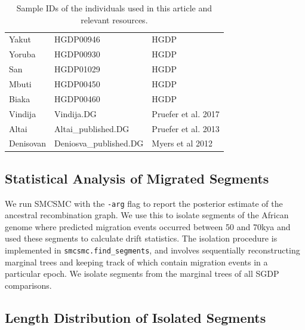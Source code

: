 \begin{table}[ht]
\begin{tabular}{lll}
      Yakut & HGDP00946 & HGDP \\ 
      Yoruba & HGDP00930 & HGDP \\ 
      San & HGDP01029 & HGDP \\ 
      Mbuti & HGDP00450 & HGDP \\ 
      Biaka & HGDP00460 & HGDP \\ 
      Vindija & Vindija.DG & Pruefer et al. 2017 \\ 
      Altai & Altai\_published.DG & Pruefer et al. 2013 \\ 
      Denisovan & Deniosva\_published.DG & Myers et al 2012 \\ 
       \hline
    \end{tabular}
    \caption[Sample identifiers]{Sample IDs of the individuals used in this article and relevant resources.} 
    \label{samples}
    \end{table}
    

    \subsection{Statistical Analysis of Migrated Segments} \label{dstats_section}

    We run SMCSMC with the {\tt -arg} flag to report the posterior estimate of the ancestral recombination graph. We use this to isolate segments of the African genome where predicted migration events occurred between 50 and 70kya and used these segments to calculate drift statistics. The isolation procedure is implemented in {\tt smcsmc.find\_segments}, and involves sequentially reconstructing marginal trees and keeping track of which contain migration events in a particular epoch. We isolate segments from the marginal trees of all SGDP comparisons. 

\subsection{Length Distribution of Isolated Segments}


